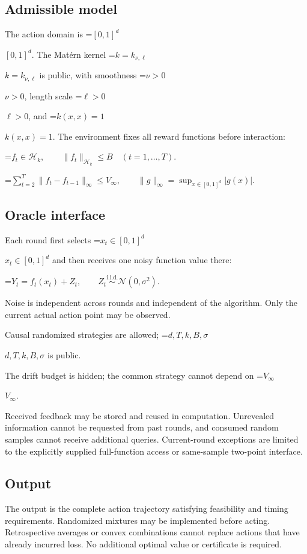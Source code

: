 \documentclass[10pt,a4paper]{article}
\newcommand{\AtlasMath}[1]{\par\begingroup\centering\setbox0=\hbox{$\displaystyle #1$}\ifdim\wd0>1.4\linewidth\typeout{ATLAS WIDE FORMULA: \the\wd0}\fi\ifdim\wd0>\linewidth\resizebox{\linewidth}{!}{\box0}\else\box0\fi\par\endgroup}
\newcommand{\AtlasInlineMath}[1]{\begingroup\setbox0=\hbox{$#1$}\ifdim\wd0>.4\linewidth\endgroup\AtlasMath{#1}\else\endgroup$#1$\fi}
\begin{document}
\subsection{Admissible model}
The action domain is \AtlasInlineMath{[0,1]^d}. The Matérn kernel \AtlasInlineMath{k=k_{\nu,\ell}} is public, with smoothness \AtlasInlineMath{\nu>0}, length scale \AtlasInlineMath{\ell>0}, and \AtlasInlineMath{k(x,x)=1}. The environment fixes all reward functions before interaction:


\AtlasMath{f_t\in\mathcal{H}_k,\qquad \|f_t\|_{\mathcal{H}_k}\le B\quad(t=1,\ldots,T).}



\AtlasMath{\sum_{t=2}^{T}\|f_t-f_{t-1}\|_\infty\le V_\infty,\qquad \|g\|_\infty=\sup_{x\in[0,1]^d}|g(x)|.}


\subsection{Oracle interface}
Each round first selects \AtlasInlineMath{x_t\in[0,1]^d} and then receives one noisy function value there:


\AtlasMath{Y_t=f_t(x_t)+Z_t,\qquad Z_t\overset{\mathrm{i.i.d.}}\sim\mathcal{N}(0,\sigma^2).}


Noise is independent across rounds and independent of the algorithm. Only the current actual action point may be observed.

Causal randomized strategies are allowed; \AtlasInlineMath{d,T,k,B,\sigma} is public.

The drift budget is hidden; the common strategy cannot depend on \AtlasInlineMath{V_\infty}.

Received feedback may be stored and reused in computation. Unrevealed information cannot be requested from past rounds, and consumed random samples cannot receive additional queries. Current-round exceptions are limited to the explicitly supplied full-function access or same-sample two-point interface.

\subsection{Output}
The output is the complete action trajectory satisfying feasibility and timing requirements. Randomized mixtures may be implemented before acting. Retrospective averages or convex combinations cannot replace actions that have already incurred loss. No additional optimal value or certificate is required.
\end{document}
